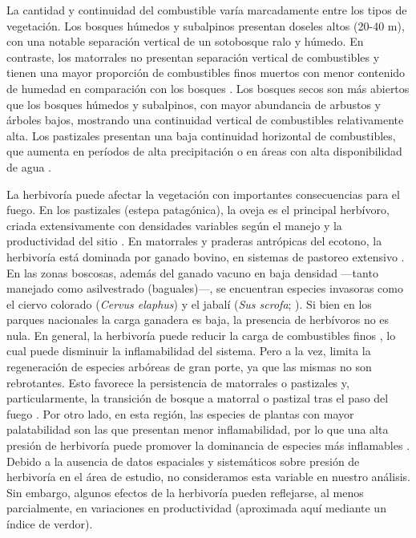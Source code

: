 La cantidad y continuidad del combustible varía marcadamente entre los tipos de vegetación. Los bosques húmedos y subalpinos presentan doseles altos (20-40 m), con una notable separación vertical de un sotobosque ralo y húmedo. En contraste, los matorrales no presentan separación vertical de combustibles y tienen una mayor proporción de combustibles finos muertos con menor contenido de humedad en comparación con los bosques \citep{paritsis_positive_2015, tiribelli_changes_2018, barbera_microclimate_2023}. Los bosques secos son más abiertos que los bosques húmedos y subalpinos, con mayor abundancia de arbustos y árboles bajos, mostrando una continuidad vertical de combustibles relativamente alta. Los pastizales presentan una baja continuidad horizontal de combustibles, que aumenta en períodos de alta precipitación o en áreas con alta disponibilidad de agua \citep{kitzberger_climatic_1997, oddi_fire_2016}. 

La herbivoría puede afectar la vegetación con importantes consecuencias para el fuego. En los pastizales (estepa patagónica), la oveja es el principal herbívoro, criada extensivamente con densidades variables según el manejo y la productividad del sitio \citep{veblen_fire_2003}. En matorrales y praderas antrópicas del ecotono, la herbivoría está dominada por ganado bovino, en sistemas de pastoreo extensivo \citep{Echevarria2017}. En las zonas boscosas, además del ganado vacuno en baja densidad —tanto manejado como asilvestrado (baguales)—, se encuentran especies invasoras como el ciervo colorado (\textit{Cervus elaphus}) y el jabalí (\textit{Sus scrofa}; \citealt{dePaz2013,barriosgarcia2023impact}). Si bien en los parques nacionales la carga ganadera es baja, la presencia de herbívoros no es nula. En general, la herbivoría puede reducir la carga de combustibles finos \citep{paritsis_positive_2015}, lo cual puede disminuir la inflamabilidad del sistema. Pero a la vez, limita la regeneración de especies arbóreas de gran porte, ya que las mismas no son rebrotantes. Esto favorece la persistencia de matorrales o pastizales y, particularmente, la transición de bosque a matorral o pastizal tras el paso del fuego \citep{veblen_adapting_2011,blackhall_effects_2017}. Por otro lado, en esta región, las especies de plantas con mayor palatabilidad son las que presentan menor inflamabilidad, por lo que una alta presión de herbivoría puede promover la dominancia de especies más inflamables \citep{veblen_adapting_2011,gowdaPalaflamabilidad}. Debido a la ausencia de datos espaciales y sistemáticos sobre presión de herbivoría en el área de estudio, no consideramos esta variable en nuestro análisis. Sin embargo, algunos efectos de la herbivoría pueden reflejarse, al menos parcialmente, en variaciones en productividad (aproximada aquí mediante un índice de verdor).

